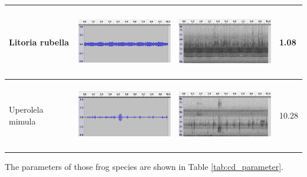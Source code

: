 \begin{table}[htb!]
{\begin{tabular}{llll}
Litoria rubella             &    \begin{minipage}{.3\textwidth} \includegraphics[width=45mm, height=30mm]{image/Ch1/rubella_jcu_wav.png}  \end{minipage}      &   \begin{minipage}{.3\textwidth} \includegraphics[width=45mm, height=30mm]{image/Ch1/rubella_jcu_spec.png}  \end{minipage}          & 1.08     \\ \hline
Uperolela mimula            &   \begin{minipage}{.3\textwidth} \includegraphics[width=45mm, height=30mm]{image/Ch1/mimula_jcu_wav.png}  \end{minipage}       &  \begin{minipage}{.3\textwidth} \includegraphics[width=45mm, height=30mm]{image/Ch1/mimula_jcu_spec.png}  \end{minipage}           & 10.28    \\ \hline\hline
\end{tabular}
}
\end{table}


\noindent The parameters of those frog species are shown in Table \ref{tab:cd_parameter}.


